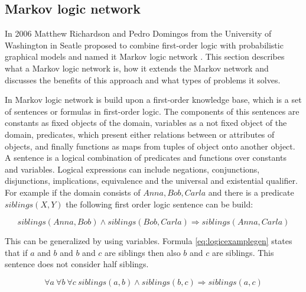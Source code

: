 


\subsection{Markov logic network} \label{sec:mln}

In 2006 Matthew Richardson and Pedro Domingos from the University of Washington in Seatle proposed to combine first-order logic with probabilistic graphical models and named it Markov logic network \cite{richardson2006markov}. This section describes what a Markov logic network is, how it extends the Markov network and discusses the benefits of this approach and what types of problems it solves.

In Markov logic network is build upon a first-order knowledge base, which is a set of sentences or formulas in first-order logic. The components of this sentences are constants as fixed objects of the domain, variables as a not fixed object of the domain, predicates, which present either relations between or attributes of objects, and finally functions as maps from tuples of object onto another object. A sentence is a logical combination of predicates and functions over constants and variables. Logical expressions can include negations, conjunctions, disjunctions, implications, equivalence and the universal and existential qualifier. For example if the domain consists of ${Anna, Bob, Carla}$ and there is a predicate $siblings(X,Y)$ the following first order logic sentence can be build:

\begin{equation}
siblings(Anna, Bob) \land siblings(Bob, Carla) \Rightarrow siblings(Anna, Carla)
\label{eq:logicexample}
\end{equation}

This can be generalized by using variables. Formula \ref{eq:logicexamplegen} states that if $a$ and $b$ and $b$ and $c$ are siblings then also $b$ and $c$ are siblings. This sentence does not consider half siblings.

\begin{equation}
\forall a\ \forall b\ \forall c\ siblings(a, b) \land siblings(b, c) \Rightarrow siblings(a, c)
\label{eq:logicexamplegen}
\end{equation}


